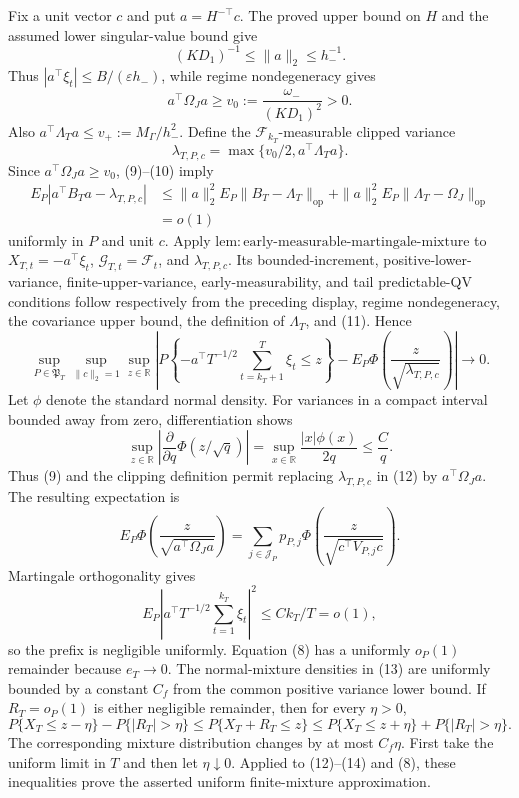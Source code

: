 Fix a unit vector \(c\) and put \(a=H^{-\top}c\). The proved upper bound on \(H\) and the assumed lower singular-value bound give
\[
 (KD_1)^{-1}\le\|a\|_2\le h_-^{-1}.
\]
Thus \(|a^\top\xi_t|\le B/(\varepsilon h_-)\), while regime nondegeneracy gives
\[
 a^\top\Omega_Ja\ge v_0:=\frac{\omega_-}{(KD_1)^2}>0.
\]
Also \(a^\top\Lambda_Ta\le v_+:=M_\Gamma/h_-^2\). Define the \(\mathcal F_{k_T}\)-measurable clipped variance
\[
 \lambda_{T,P,c}=\max\{v_0/2,a^\top\Lambda_Ta\}.
\]
Since \(a^\top\Omega_Ja\ge v_0\), (9)--(10) imply
\[
\begin{aligned}
 E_P|a^\top B_Ta-\lambda_{T,P,c}|
 &\le \|a\|_2^2E_P\|B_T-\Lambda_T\|_{\mathrm{op}}
   +\|a\|_2^2E_P\|\Lambda_T-\Omega_J\|_{\mathrm{op}}\\
 &=o(1)
\end{aligned}
\tag{11}
\]
uniformly in \(P\) and unit \(c\). Apply \(\mathrm{lem:early\text{-}measurable\text{-}martingale\text{-}mixture}\) to \(X_{T,t}=-a^\top\xi_t\), \(\mathcal G_{T,t}=\mathcal F_t\), and \(\lambda_{T,P,c}\). Its bounded-increment, positive-lower-variance, finite-upper-variance, early-measurability, and tail predictable-QV conditions follow respectively from the preceding display, regime nondegeneracy, the covariance upper bound, the definition of \(\Lambda_T\), and (11). Hence
\[
 \sup_{P\in\mathfrak P_T}\sup_{\|c\|_2=1}\sup_{z\in\mathbb R}
 \left|P\left\{-a^\top T^{-1/2}\sum_{t=k_T+1}^T\xi_t\le z\right\}
 -E_P\Phi\left(\frac z{\sqrt{\lambda_{T,P,c}}}\right)\right|\longrightarrow0.
\tag{12}
\]
Let \(\phi\) denote the standard normal density. For variances in a compact interval bounded away from zero, differentiation shows
\[
 \sup_{z\in\mathbb R}\left|\frac{\partial}{\partial q}\Phi(z/\sqrt q)\right|
 =\sup_{x\in\mathbb R}\frac{|x|\phi(x)}{2q}\le \frac{C}{q}.
\]
Thus (9) and the clipping definition permit replacing \(\lambda_{T,P,c}\) in (12) by \(a^\top\Omega_Ja\). The resulting expectation is
\[
 E_P\Phi\left(\frac z{\sqrt{a^\top\Omega_Ja}}\right)
 =\sum_{j\in\mathcal J_P}p_{P,j}\Phi\left(\frac z{\sqrt{c^\top V_{P,j}c}}\right).
\tag{13}
\]
Martingale orthogonality gives
\[
 E_P\left|a^\top T^{-1/2}\sum_{t=1}^{k_T}\xi_t\right|^2
 \le Ck_T/T=o(1),
\tag{14}
\]
so the prefix is negligible uniformly. Equation (8) has a uniformly \(o_P(1)\) remainder because \(e_T\to0\). The normal-mixture densities in (13) are uniformly bounded by a constant \(C_f\) from the common positive variance lower bound. If \(R_T=o_P(1)\) is either negligible remainder, then for every \(\eta>0\),
\[
 P\{X_T\le z-\eta\}-P\{|R_T|>\eta\}
 \le P\{X_T+R_T\le z\}
 \le P\{X_T\le z+\eta\}+P\{|R_T|>\eta\}.
\]
The corresponding mixture distribution changes by at most \(C_f\eta\). First take the uniform limit in \(T\) and then let \(\eta\downarrow0\). Applied to (12)--(14) and (8), these inequalities prove the asserted uniform finite-mixture approximation.

